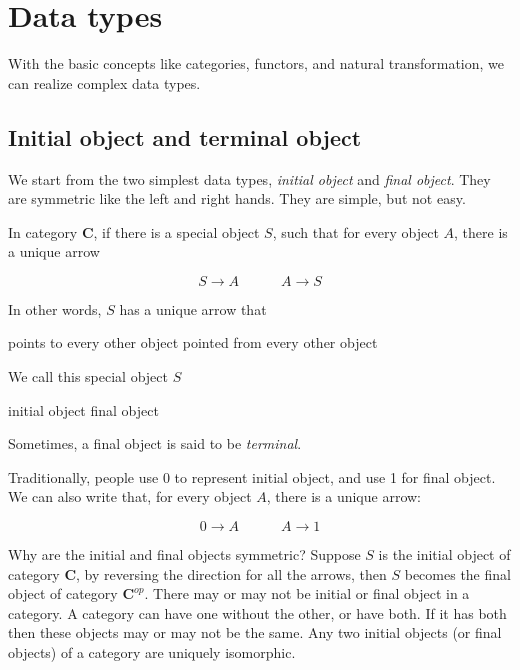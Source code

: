 \documentclass{article}
\begin{document}
\section{Data types}

With the basic concepts like categories, functors, and natural transformation, we can realize complex data types.

\subsection{Initial object and terminal object}
We start from the two simplest data types, {\em initial object} and {\em final object}. They are symmetric like the left and right hands. They are simple, but not easy.

 
\begin{definition}
\normalfont
In category $\pmb{C}$, if there is a special object $S$, such that for every object $A$, there is a unique arrow

\[
  S \longrightarrow A \quad \quad \quad A \longrightarrow S
\]

In other words, $S$ has a unique arrow that

\begin{center}
  points to every other object  \quad \quad \quad pointed from every other object
\end{center}

We call this special object $S$

\begin{center}
  initial object \quad \quad \quad final object
\end{center}

Sometimes, a final object is said to be {\em terminal}.
\end{definition}

Traditionally, people use 0 to represent initial object, and use 1 for final object. We can also write that, for every object $A$, there is a unique arrow:

\[
  0 \longrightarrow A \quad \quad \quad A \longrightarrow 1
\]

Why are the initial and final objects symmetric? Suppose $S$ is the initial object of category $\pmb{C}$, by reversing the direction for all the arrows, then $S$ becomes the final object of category $\pmb{C}^{op}$. There may or may not be initial or final object in a category. A category can have one without the other, or have both. If it has both then these objects may or may not be the same. Any two initial objects (or final objects) of a category are uniquely isomorphic.
\end{document}

